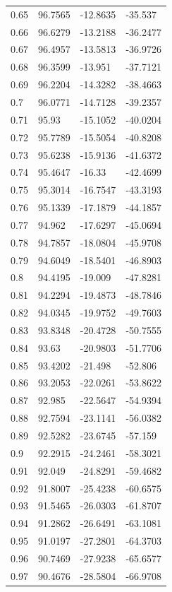 \begin{tabular}{llll}
0.65 & 96.7565 & -12.8635 & -35.537 \\
0.66 & 96.6279 & -13.2188 & -36.2477 \\
0.67 & 96.4957 & -13.5813 & -36.9726 \\
0.68 & 96.3599 & -13.951 & -37.7121 \\
0.69 & 96.2204 & -14.3282 & -38.4663 \\
0.7 & 96.0771 & -14.7128 & -39.2357 \\
0.71 & 95.93 & -15.1052 & -40.0204 \\
0.72 & 95.7789 & -15.5054 & -40.8208 \\
0.73 & 95.6238 & -15.9136 & -41.6372 \\
0.74 & 95.4647 & -16.33 & -42.4699 \\
0.75 & 95.3014 & -16.7547 & -43.3193 \\
0.76 & 95.1339 & -17.1879 & -44.1857 \\
0.77 & 94.962 & -17.6297 & -45.0694 \\
0.78 & 94.7857 & -18.0804 & -45.9708 \\
0.79 & 94.6049 & -18.5401 & -46.8903 \\
0.8 & 94.4195 & -19.009 & -47.8281 \\
0.81 & 94.2294 & -19.4873 & -48.7846 \\
0.82 & 94.0345 & -19.9752 & -49.7603 \\
0.83 & 93.8348 & -20.4728 & -50.7555 \\
0.84 & 93.63 & -20.9803 & -51.7706 \\
0.85 & 93.4202 & -21.498 & -52.806 \\
0.86 & 93.2053 & -22.0261 & -53.8622 \\
0.87 & 92.985 & -22.5647 & -54.9394 \\
0.88 & 92.7594 & -23.1141 & -56.0382 \\
0.89 & 92.5282 & -23.6745 & -57.159 \\
0.9 & 92.2915 & -24.2461 & -58.3021 \\
0.91 & 92.049 & -24.8291 & -59.4682 \\
0.92 & 91.8007 & -25.4238 & -60.6575 \\
0.93 & 91.5465 & -26.0303 & -61.8707 \\
0.94 & 91.2862 & -26.6491 & -63.1081 \\
0.95 & 91.0197 & -27.2801 & -64.3703 \\
0.96 & 90.7469 & -27.9238 & -65.6577 \\
0.97 & 90.4676 & -28.5804 & -66.9708 \\

\end{tabular}
